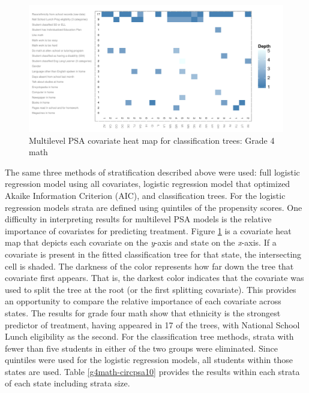 \documentclass[letterpaper,12p,twoside]{article} %
\begin{document}
\begin{figure}[t]
\begin{center}
\includegraphics[width=\textwidth]{../Figures2009/g4math-mlpsa-ctree-heat.pdf}
\caption{Multilevel PSA covariate heat map for classification trees: Grade 4 math}
\label{fig:g4math-mlpsa-ctree-heat}
\end{center}
\end{figure}

The same three methods of stratification described above were used: full logistic regression model using all covariates, logistic regression model that optimized Akaike Information Criterion (AIC), and classification trees. For the logistic regression models strata are defined using quintiles of the propensity scores. One difficulty in interpreting results for multilevel PSA models is the relative importance of covariates for predicting treatment. Figure \ref{fig:g4math-mlpsa-ctree-heat} is a covariate heat map that depicts each covariate on the \textit{y}-axis and state on the \textit{x}-axis. If a covariate is present in the fitted classification tree for that state, the intersecting cell is shaded. The darkness of the color represents how far down the tree that covariate first appears. That is, the darkest color indicates that the covariate was used to split the tree at the root (or the first splitting covariate). This provides an opportunity to compare the relative importance of each covariate across states. The results for grade four math show that ethnicity is the strongest predictor of treatment, having appeared in 17 of the trees, with National School Lunch eligibility as the second. For the classification tree methods, strata with fewer than five students in either of the two groups were eliminated. Since quintiles were used for the logistic regression models, all students within those states are used. Table \ref{g4math-circpsa10} provides the results within each strata of each state including strata size.
\end{document}
